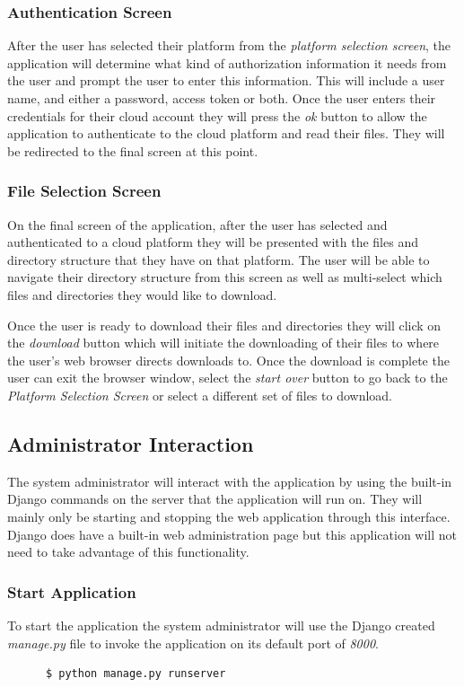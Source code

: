 \documentclass{article}
\begin{document}
      \subsubsection{Authentication Screen}
      After the user has selected their platform from the \textit{platform selection screen}, the application will
      determine what kind of authorization information it needs from the user and prompt the user to enter this information.
      This will include a user name, and either a password, access token or both. Once the user enters their credentials for
      their cloud account they will press the \textit{ok} button to allow the application to authenticate to the cloud platform
      and read their files. They will be redirected to the final screen at this point.
    
      \subsubsection{File Selection Screen}
      On the final screen of the application, after the user has selected and authenticated to a cloud platform they will be
      presented with the files and directory structure that they have on that platform. The user will be able to navigate their
      directory structure from this screen as well as multi-select which files and directories they would like to download.

      Once the user is ready to download their files and directories they will click on the \textit{download} button which will
      initiate the downloading of their files to where the user's web browser directs downloads to. Once the download is complete
      the user can exit the browser window, select the \textit{start over} button to go back to the \textit{Platform Selection Screen}
      or select a different set of files to download.
    
    \subsection{Administrator Interaction}
    The system administrator will interact with the application by using the built-in Django commands on the
    server that the application will run on. They will mainly only be starting and stopping the web application
    through this interface. Django does have a built-in web administration page but this application will not
    need to take advantage of this functionality.

      \subsubsection{Start Application}
      To start the application the system administrator will use the Django created \textit{manage.py} file
      to invoke the application on its default port of \textit{8000}.
      \begin{verbatim}
      $ python manage.py runserver
      \end{verbatim}
\end{document}
